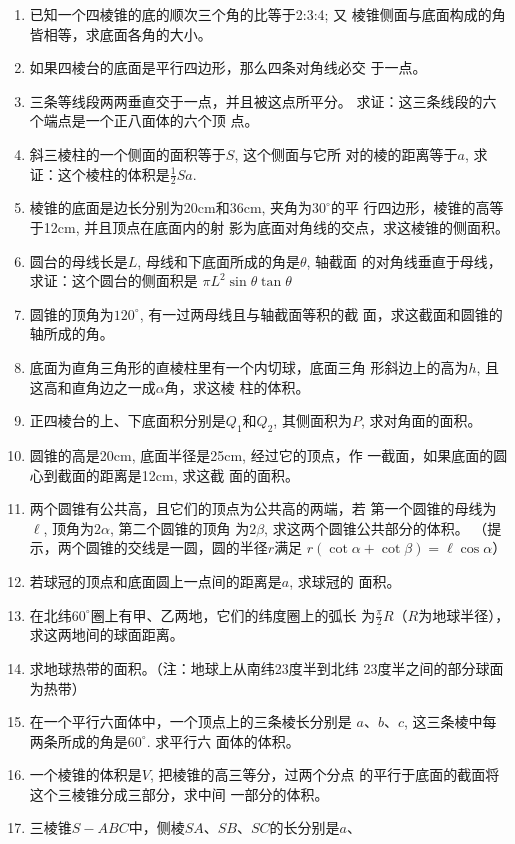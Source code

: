 \begin{enumerate}
\item 已知一个四棱锥的底的顺次三个角的比等于2:3:4; 又
棱锥侧面与底面构成的角皆相等，求底面各角的大小。
\item 如果四棱台的底面是平行四边形，那么四条对角线必交
于一点。
\item 三条等线段两两垂直交于一点，并且被这点所平分。
求证：这三条线段的六个端点是一个正八面体的六个顶
点。
\item 斜三棱柱的一个侧面的面积等于$S$, 这个侧面与它所
对的棱的距离等于$a$, 求证：这个棱柱的体积是$\frac{1}{2}Sa$.
\item 棱锥的底面是边长分别为20cm和36cm, 夹角为$30^{\circ}$的平
行四边形，棱锥的高等于12cm, 并且顶点在底面内的射
影为底面对角线的交点，求这棱锥的侧面积。
\item 圆台的母线长是$L$, 母线和下底面所成的角是$\theta$, 轴截面
的对角线垂直于母线，求证：这个圆台的侧面积是
$\pi L^2\sin\theta \tan\theta$
\item 圆锥的顶角为$120^{\circ}$, 有一过两母线且与轴截面等积的截
面，求这截面和圆锥的轴所成的角。
\item 底面为直角三角形的直棱柱里有一个内切球，底面三角
形斜边上的高为$h$, 且这高和直角边之一成$\alpha$角，求这棱
柱的体积。
\item 正四棱台的上、下底面积分别是$Q_1$和$Q_2$, 其侧面积为$P$, 
求对角面的面积。
\item 圆锥的高是20cm, 底面半径是25cm, 经过它的顶点，作
一截面，如果底面的圆心到截面的距离是12cm, 求这截
面的面积。
\item 两个圆锥有公共高，且它们的顶点为公共高的两端，若
第一个圆锥的母线为$\ell$, 顶角为$2\alpha$, 第二个圆锥的顶角
为$2\beta$, 求这两个圆锥公共部分的体积。
（提示，两个圆锥的交线是一圆，圆的半径$r$满足
$r(\cot\alpha+\cot\beta)=\ell\cos\alpha$）
\item 若球冠的顶点和底面圆上一点间的距离是$a$, 求球冠的
面积。
\item 在北纬$60^{\circ}$圈上有甲、乙两地，它们的纬度圈上的弧长
为$\frac{\pi}{2}R$（$R$为地球半径），求这两地间的球面距离。
\item 求地球热带的面积。（注：地球上从南纬23度半到北纬
23度半之间的部分球面为热带）
\item 在一个平行六面体中，一个顶点上的三条棱长分别是
$a$、$b$、$c$, 这三条棱中每两条所成的角是$60^{\circ}$. 求平行六
面体的体积。
\item 一个棱锥的体积是$V$, 把棱锥的高三等分，过两个分点
的平行于底面的截面将这个三棱锥分成三部分，求中间
一部分的体积。
\item 三棱锥$S-ABC$中，侧棱$SA$、$SB$、$SC$的长分别是$a$、

\end{enumerate}
